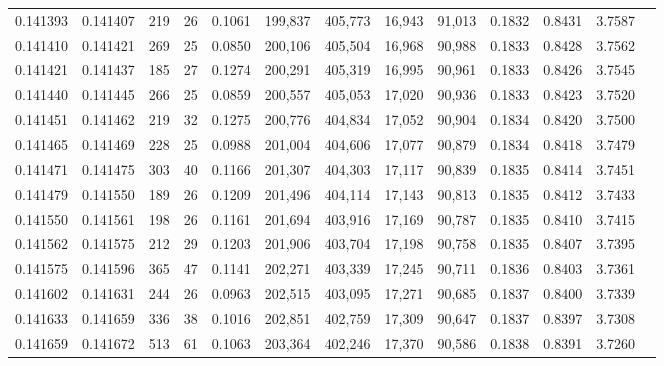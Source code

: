 \begin{tabular}{rrrrrrrrrrrrr}
0.141393 & 0.141407 &   219 &  26 &                                     0.1061 & 199,837 & 405,773 &  16,943 &  91,013 & 0.1832 & 0.8431 & 3.7587 \\
0.141410 & 0.141421 &   269 &  25 &                                     0.0850 & 200,106 & 405,504 &  16,968 &  90,988 & 0.1833 & 0.8428 & 3.7562 \\
0.141421 & 0.141437 &   185 &  27 &                                     0.1274 & 200,291 & 405,319 &  16,995 &  90,961 & 0.1833 & 0.8426 & 3.7545 \\
0.141440 & 0.141445 &   266 &  25 &                                     0.0859 & 200,557 & 405,053 &  17,020 &  90,936 & 0.1833 & 0.8423 & 3.7520 \\
0.141451 & 0.141462 &   219 &  32 &                                     0.1275 & 200,776 & 404,834 &  17,052 &  90,904 & 0.1834 & 0.8420 & 3.7500 \\
0.141465 & 0.141469 &   228 &  25 &                                     0.0988 & 201,004 & 404,606 &  17,077 &  90,879 & 0.1834 & 0.8418 & 3.7479 \\
0.141471 & 0.141475 &   303 &  40 &                                     0.1166 & 201,307 & 404,303 &  17,117 &  90,839 & 0.1835 & 0.8414 & 3.7451 \\
0.141479 & 0.141550 &   189 &  26 &                                     0.1209 & 201,496 & 404,114 &  17,143 &  90,813 & 0.1835 & 0.8412 & 3.7433 \\
0.141550 & 0.141561 &   198 &  26 &                                     0.1161 & 201,694 & 403,916 &  17,169 &  90,787 & 0.1835 & 0.8410 & 3.7415 \\
0.141562 & 0.141575 &   212 &  29 &                                     0.1203 & 201,906 & 403,704 &  17,198 &  90,758 & 0.1835 & 0.8407 & 3.7395 \\
0.141575 & 0.141596 &   365 &  47 &                                     0.1141 & 202,271 & 403,339 &  17,245 &  90,711 & 0.1836 & 0.8403 & 3.7361 \\
0.141602 & 0.141631 &   244 &  26 &                                     0.0963 & 202,515 & 403,095 &  17,271 &  90,685 & 0.1837 & 0.8400 & 3.7339 \\
0.141633 & 0.141659 &   336 &  38 &                                     0.1016 & 202,851 & 402,759 &  17,309 &  90,647 & 0.1837 & 0.8397 & 3.7308 \\
0.141659 & 0.141672 &   513 &  61 &                                     0.1063 & 203,364 & 402,246 &  17,370 &  90,586 & 0.1838 & 0.8391 & 3.7260 \\

\end{tabular}
